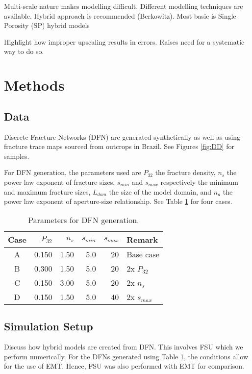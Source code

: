 \documentclass[a4paper]{article}
\begin{document}
Multi-scale nature makes modelling difficult. Different modelling techniques are available. Hybrid approach is recommended (Berkowitz). Most basic is Single Porosity (SP) hybrid models 

Highlight how improper upscaling results in errors. Raises need for a systematic way to do so.

\section{Methods}
\subsection{Data}
Discrete Fracture Networks (DFN) are generated synthetically as well as using fracture trace maps sourced from outcrops in Brazil. See Figures \ref{fig:DD} for samples.

For DFN generation, the parameters used are $P_{32}$ the fracture density, $n_s$ the power law exponent of fracture sizes, $s_{min}$ and $s_{max}$ respectively the minimum and maximum fracture sizes, $L_{dom}$ the size of the model domain, and $n_a$ the power law exponent of aperture-size relationship. See Table \ref{table:DFNparams} for four cases.

\begin{table}[h]
	\centering
	\caption{Parameters for DFN generation.}
	
	\begin{tabular}{c r r r r l}
		Case & $P_{32}$ & $n_s$ & $s_{min}$ & $s_{max}$ & Remark \\
		\hline
		A & 0.150 & 1.50 & 5.0 & 20 & Base case\\
		B & 0.300 & 1.50 & 5.0 & 20 & 2x $P_{32}$\\
		C & 0.150 & 3.00 & 5.0 & 20 & 2x $n_s$\\
		D & 0.150 & 1.50 & 5.0 & 40 & 2x $s_{max}$\\
		
	\end{tabular}
	\label{table:DFNparams}
\end{table}



\subsection{Simulation Setup}
Discuss how hybrid models are created from DFN. This involves FSU which we perform numerically. For the DFNs generated using Table \ref{table:DFNparams}, the conditions allow for the use of EMT. Hence, FSU was also performed with EMT for comparison.
\end{document}
